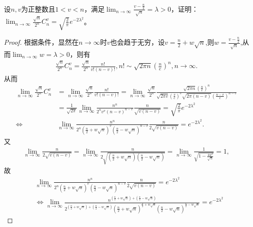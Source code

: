 \documentclass[../../main.tex]{subfiles}
\begin{document}
\begin{example}
设\(n,v\)为正整数且\(1 < v < n\)，满足\(\lim_{n\rightarrow\infty}\frac{v-\frac{n}{2}}{\sqrt{n}}=\lambda>0\)，证明：\(\lim_{n\rightarrow\infty}\frac{\sqrt{n}}{2^n}C_n^v=\sqrt{\frac{2}{\pi}}e^{-2\lambda^2}\)。
\end{example}
\begin{proof}
根据条件，显然在\(n\rightarrow\infty\)时\(v\)也会趋于无穷，设\(v = \frac{n}{2}+w\sqrt{n}\),则$w=\frac{v-\frac{n}{2}}{\sqrt{n}}$,从而\(\lim_{n\rightarrow\infty}w=\lambda>0\)，则有
\begin{align*}
\frac{\sqrt{n}}{2^n}C_n^v=\frac{\sqrt{n}}{2^n}\frac{n!}{v!(n - v)!},n!\sim\sqrt{2\pi n}\left(\frac{n}{e}\right)^n,n\to \infty.
\end{align*}
从而
\begin{align*}
\lim_{n\rightarrow \infty} \frac{\sqrt{n}}{2^n}C_{n}^{v}&=\underset{n\rightarrow \infty}{\lim}\frac{\sqrt{n}}{2^n}\frac{n!}{v!\left( n-v \right) !}=\lim_{n\rightarrow \infty} \frac{\sqrt{n}}{2^n}\frac{\sqrt{2\pi n}\left( \frac{n}{e} \right) ^n}{\sqrt{2\pi v}\left( \frac{v}{e} \right) ^v\sqrt{2\pi (n-v)}\left( \frac{n-v}{e} \right) ^{n-v}}
\\
&=\frac{1}{\sqrt{2\pi}}\lim_{n\rightarrow \infty} \frac{n^n}{2^nv^v(n-v)^{n-v}}\frac{n}{\sqrt{v(n-v)}}=\sqrt{\frac{2}{\pi}}e^{-2\lambda ^2}
\\
\Leftrightarrow &\lim_{n\rightarrow \infty} \frac{n^n}{2^n\left( \frac{n}{2}+w\sqrt{n} \right) ^v\left( \frac{n}{2}-w\sqrt{n} \right) ^{n-v}}\frac{n}{2\sqrt{v(n-v)}}=e^{-2\lambda ^2}.
\end{align*}
又
\begin{align*}
\lim_{n\rightarrow \infty} \frac{n}{2\sqrt{v(n-v)}}=\lim_{n\rightarrow \infty} \frac{n}{2\sqrt{\left( \frac{n}{2}+w\sqrt{n} \right) \left( \frac{n}{2}-w\sqrt{n} \right)}}=\lim_{n\rightarrow \infty} \frac{1}{\sqrt{1-\frac{4w^2}{\sqrt{n}}}}=1,
\end{align*}
故
\begin{align}
&\lim_{n\rightarrow \infty} \frac{n^n}{2^n\left( \frac{n}{2}+w\sqrt{n} \right) ^v\left( \frac{n}{2}-w\sqrt{n} \right) ^{n-v}}\frac{n}{2\sqrt{v(n-v)}}=e^{-2\lambda ^2}
\nonumber
\\
&\Leftrightarrow \lim_{n\rightarrow \infty} \frac{n^{\left( \frac{n}{2}+w\sqrt{n} \right) +\left( \frac{n}{2}-w\sqrt{n} \right)}}{2^{\left( \frac{n}{2}+w\sqrt{n} \right) +\left( \frac{n}{2}-w\sqrt{n} \right)}\left( \frac{n}{2}+w\sqrt{n} \right) ^{\frac{n}{2}+w\sqrt{n}}\left( \frac{n}{2}-w\sqrt{n} \right) ^{\frac{n}{2}-w\sqrt{n}}}=e^{-2\lambda ^2}

\end{align}
\end{proof}
\end{document}
